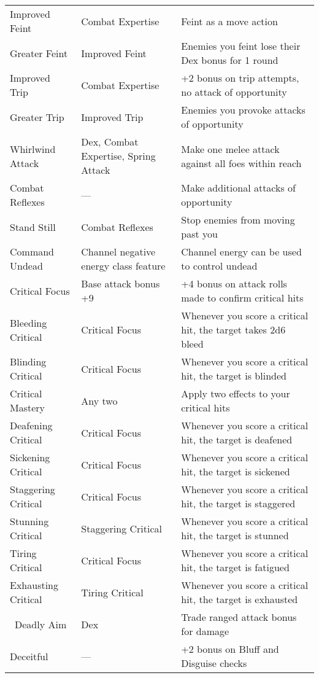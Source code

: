 \begin{table*}[]
\begin{tabularx}{\linewidth}{lXl}
\quad Improved Feint & Combat Expertise & Feint as a move action\\
\quad \quad Greater Feint & Improved Feint & Enemies you feint lose their Dex bonus for 1 round \\
\quad Improved Trip & Combat Expertise & +2 bonus on trip attempts, no attack of opportunity\\
\quad \quad Greater Trip & Improved Trip & Enemies you provoke attacks of opportunity\\
\quad Whirlwind Attack & Dex, Combat Expertise, Spring Attack & Make one melee attack against all foes within reach\\
Combat Reflexes & --- & Make additional attacks of opportunity\\
\quad Stand Still & Combat Reflexes & Stop enemies from moving past you\\
Command Undead & Channel negative energy class feature & Channel energy can be used to control undead\\
Critical Focus & Base attack bonus +9 & +4 bonus on attack rolls made to confirm critical hits\\
\quad Bleeding Critical & Critical Focus & Whenever you score a critical hit, the target takes 2d6 bleed \\
\quad Blinding Critical & Critical Focus & Whenever you score a critical hit, the target is blinded\\
\quad Critical Mastery & Any two  & Apply two effects to your critical hits\\
\quad Deafening Critical & Critical Focus & Whenever you score a critical hit, the target is deafened\\
\quad Sickening Critical & Critical Focus & Whenever you score a critical hit, the target is sickened\\
\quad Staggering Critical & Critical Focus & Whenever you score a critical hit, the target is staggered\\
\quad Stunning Critical & Staggering Critical & Whenever you score a critical hit, the target is stunned\\
\quad Tiring Critical & Critical Focus & Whenever you score a critical hit, the target is fatigued\\
\quad \quad Exhausting Critical & Tiring Critical & Whenever you score a critical hit, the target is exhausted\\\
Deadly Aim & Dex & Trade ranged attack bonus for damage\\
Deceitful & --- & +2 bonus on Bluff and Disguise checks\\

\end{tabularx}
\end{table*}
